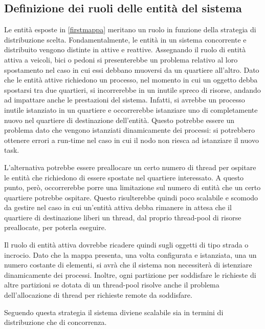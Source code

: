 \subsection{Definizione dei ruoli delle entità del sistema}
Le entità esposte in \ref{firstmappa} meritano un ruolo in funzione della
strategia di distribuzione scelta. Fondamentalmente, le entità in un sistema
concorrente e distribuito vengono distinte in attive e reattive.
Assegnando il ruolo di entità attiva a veicoli, bici o pedoni si presenterebbe
un problema relativo al loro spostamento nel caso in cui essi debbano muoversi
da un quartiere all'altro.
Dato che le entità attive richiedono un processo, nel momento in cui un oggetto
debba spostarsi tra due quartieri, si incorrerebbe in un inutile spreco di
risorse, andando ad impattare anche le prestazioni del sistema.
Infatti, si avrebbe un processo inutile istanziato in un quartiere e
occorrerebbe istanziare uno di completamente nuovo nel quartiere di destinazione
dell'entità.
Questo potrebbe essere un problema dato che vengono istanziati dinamicamente dei
processi: si potrebbero ottenere errori a run-time nel caso in cui il nodo non
riesca ad istanziare il nuovo task.

L'alternativa potrebbe essere preallocare un certo numero di thread per ospitare
le entità che richiedono di essere spostate nel quartiere interessato.
A questo punto, però, occorrerebbe porre una limitazione sul numero di entità
che un certo quartiere potrebbe ospitare.
Questo risulterebbe quindi poco scalabile e scomodo da gestire nel caso in
cui un'entità attiva debba rimanere in attesa che il quartiere di
destinazione liberi un thread, dal proprio thread-pool di risorse preallocate,
per poterla eseguire.

Il ruolo di entità attiva dovrebbe ricadere quindi sugli oggetti di tipo strada
o incrocio. 
Dato che la mappa presenta, una volta configurata e istanziata, una un numero
costante di elementi, si avrà che il sistema non necessiterà di istenziare
dinamicamente dei processi.
Inoltre, ogni partizione per soddisfare le richieste di altre partizioni se
dotata di un thread-pool risolve anche il problema dell'allocazione di thread
per richieste remote da soddisfare.

Seguendo questa strategia il sistema diviene scalabile sia in termini di
distribuzione che di concorrenza.


